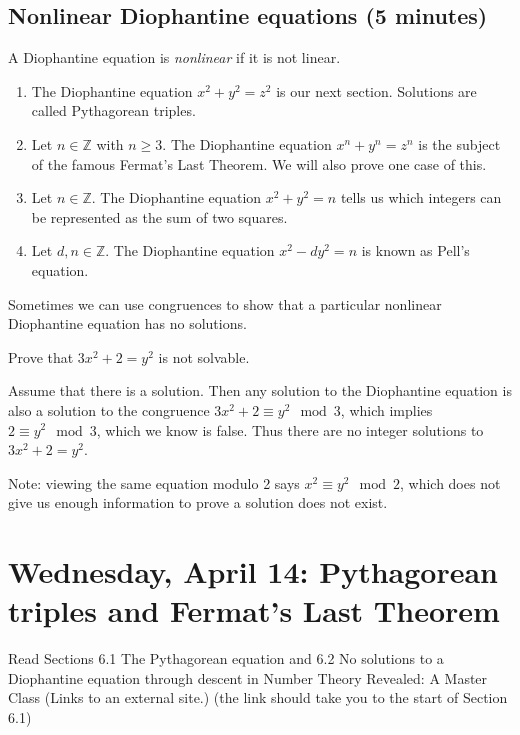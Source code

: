 \documentclass[letterpaper, 11 pt]{article}
\begin{document}
\subsection{Nonlinear Diophantine equations (5 minutes)}
\begin{defn}
 A Diophantine equation is \emph{nonlinear} if it is not linear.
\end{defn}

\begin{example}
 
\begin{enumerate}
 \item The Diophantine equation $x^2+y^2=z^2$ is our next section. Solutions are called Pythagorean triples.
 \item Let $n\in\mathbb{Z}$ with $n\geq 3$. The Diophantine equation $x^n+y^n=z^n$ is the subject of the famous Fermat's Last Theorem. We will also prove one case of this.
 \item Let $n\in\mathbb{Z}$. The Diophantine equation $x^2+y^2=n$ tells us which integers can be represented as the sum of two squares.
 \item Let $d,n\in\mathbb{Z}$. The Diophantine equation $x^2-dy^2=n$ is known as Pell's equation.
\end{enumerate}
\end{example}

Sometimes we can use congruences to show that a particular nonlinear Diophantine equation has no solutions. 

\begin{example}
 Prove that $3x^2+2=y^2$ is not solvable.
 
 Assume that there is a solution. Then any solution to the Diophantine equation is also a solution to the congruence $3x^2+2\equiv y^2 \mod 3$, which implies $2\equiv y^2 \mod 3$, which we know is false. Thus there are no integer solutions to $3x^2+2=y^2$.
\end{example}

Note: viewing the same equation modulo 2 says $x^2\equiv y^2 \mod 2$, which does not give us enough information to prove a solution does not exist.
\section{Wednesday, April 14: Pythagorean triples and Fermat's Last Theorem}
Read Sections 6.1 The Pythagorean equation and 6.2 No solutions to a Diophantine equation through descent in Number Theory Revealed: A Master Class (Links to an external site.) (the link should take you to the start of Section 6.1)
\end{document}

